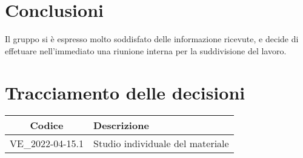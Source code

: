 \section{Conclusioni}
Il gruppo si è espresso molto soddisfato delle informazione ricevute, e decide di effetuare nell'immediato una riunione interna per la suddivisione del lavoro.
\newpage

\section*{Tracciamento delle decisioni}
	\renewcommand{\arraystretch}{1.8} %
	\begin{tabular}{ |c|l| }
		\hline
		\textbf{Codice} & \textbf{Descrizione} \\
		\hline
		VE\_2022-04-15.1 & Studio individuale del materiale\\ %
		\hline
	\end{tabular}